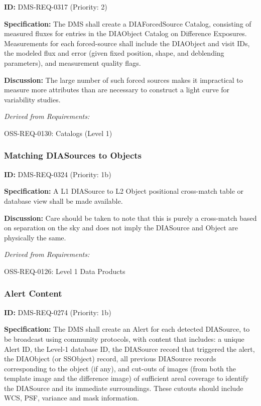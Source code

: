 \documentclass[SE,toc,lsstdraft]{lsstdoc}
\begin{document}
\label{DMS-REQ-0317}
\textbf{ID:} DMS-REQ-0317 (Priority: 2)

\textbf{Specification:} The DMS shall create a DIAForcedSource Catalog, consisting of measured fluxes for entries in the DIAObject Catalog on Difference Exposures. Measurements for each forced-source shall include the DIAObject and visit IDs, the modeled flux and error (given fixed position, shape, and deblending parameters), and measurement quality flags.

\textbf{Discussion: }The large number of such forced sources makes it impractical to measure more attributes than are necessary to construct a light curve for variability studies.

\emph{Derived from Requirements:}

OSS-REQ-0130:
Catalogs (Level 1) \newline

\subsubsection{Matching DIASources to Objects}

\label{DMS-REQ-0324}
\textbf{ID:} DMS-REQ-0324 (Priority: 1b)

\textbf{Specification:} A L1 DIASource to L2 Object positional cross-match table or database view shall be made available.

\textbf{Discussion:} Care should be taken to note that this is purely a cross-match based on separation on the sky and does not imply the DIASource and Object are physically the same.

\emph{Derived from Requirements:}

OSS-REQ-0126:
Level 1 Data Products \newline

\subsubsection{Alert Content}

\label{DMS-REQ-0274}
\textbf{ID:} DMS-REQ-0274 (Priority: 1b)

\textbf{Specification:} The DMS shall create an Alert for each detected DIASource, to be broadcast using community protocols, with content that includes: a unique Alert ID, the Level-1 database ID, the DIASource record that triggered the alert, the DIAObject (or SSObject) record, all previous DIASource records corresponding to the object (if any), and cut-outs of images (from both the template image and the difference image) of sufficient areal coverage to identify the DIASource and its immediate surroundings. These cutouts should include WCS, PSF, variance and mask information.
\end{document}
